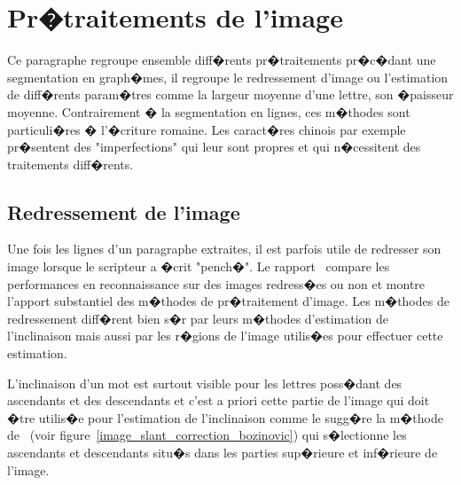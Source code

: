 \section{Pr�traitements de l'image}

Ce paragraphe regroupe ensemble diff�rents pr�traitements pr�c�dant une segmentation en graph�mes, il regroupe le redressement d'image ou l'estimation de diff�rents param�tres comme la largeur moyenne d'une lettre, son �paisseur moyenne. Contrairement � la segmentation en lignes, ces m�thodes sont particuli�res � l'�criture romaine. Les caract�res chinois par exemple pr�sentent des "imperfections" qui leur sont propres et qui n�cessitent des traitements diff�rents.




\subsection{Redressement de l'image}
\label{image_redressement_sobel}

Une fois les lignes d'un paragraphe extraites, il est parfois utile de redresser son image lorsque le scripteur a �crit "pench�". Le rapport~ compare les performances en reconnaissance sur des images redress�es ou non et montre l'apport substantiel des m�thodes de pr�traitement d'image. Les m�thodes de redressement diff�rent bien s�r par leurs m�thodes d'estimation de l'inclinaison mais aussi par les r�gions de l'image utilis�es pour effectuer cette estimation. 

L'inclinaison d'un mot est surtout visible pour les lettres poss�dant des ascendants et des descendants et c'est a priori cette partie de l'image qui doit �tre utilis�e pour l'estimation de l'inclinaison comme le sugg�re la m�thode de~ (voir figure~\ref{image_slant_correction_bozinovic}) qui s�lectionne les ascendants et descendants situ�s dans les parties sup�rieure et inf�rieure de l'image. 


